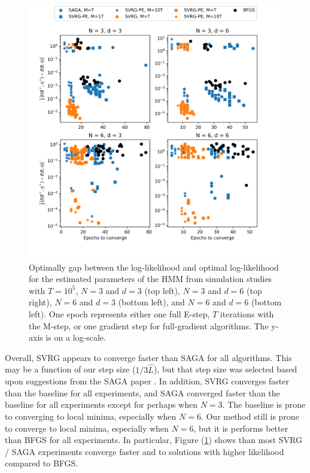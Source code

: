 \begin{figure}
    \centering
    \includegraphics[width=6.5in]{../plt/scatter_sim.png}
    \caption{Optimally gap between the log-likelihood and optimal log-likelihood for the estimated parameters of the HMM from simulation studies with $T=10^{5}$, $N=3$ and $d=3$ (top left), $N=3$ and $d=6$ (top right), $N=6$ and $d=3$ (bottom left), and $N=6$ and $d=6$ (bottom left). One epoch represents either one full E-step, $T$ iterations with the M-step, or one gradient step for full-gradient algorithms. The y-axis is on a log-scale.}
    \label{fig:scatter_sim}
\end{figure}
%
Overall, SVRG appears to converge faster than SAGA for all algorithms. This may be a function of our step size ($1/3 \hat L$), but that step size was selected based upon suggestions from the SAGA paper \citep{Defazio:2014}. In addition, SVRG converges faster than the baseline for all experiments, and SAGA converged faster than the baseline for all experiments except for perhaps when $N=3$. The baseline is prone to converging to local minima, especially when $N=6$. Our method still is prone to converge to local minima, especially when $N=6$, but it is performs better than BFGS for all experiments. In particular, Figure (\ref{fig:scatter_sim}) shows than most SVRG / SAGA experiments converge faster and to solutions with higher likelihood compared to BFGS.

